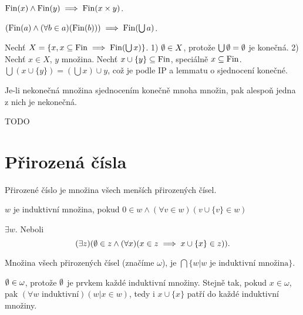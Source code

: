 \documentclass[12pt]{article}                   %
\begin{document}
    \begin{dusledek}
        $\operatorname{Fin}(x) \land \operatorname{Fin}(y) \implies \operatorname{Fin}(x \times y)$.
    \end{dusledek}

    \begin{lemma}
        $(\operatorname{Fin}(a) \land (\forall b \in a)(\operatorname{Fin}(b))) \implies \operatorname{Fin}(\bigcup a)$.

        \begin{dukazin}[Indukcí]
            Nechť $X = \{x, x \subseteq \operatorname{Fin} \implies \operatorname{Fin}(\bigcup x)\}$. 1) $\emptyset \in X$, protože $\bigcup \emptyset = \emptyset$ je konečná. 2) Nechť $x \in X$, $y$ množina. Nechť $x \cup \{y\} \subseteq \operatorname{Fin}$, speciálně $x \subseteq \operatorname{Fin}$. $\bigcup (x \cup \{y\}) = (\bigcup x)\cup y$, což je podle IP a lemmatu o sjednocení konečné.
        \end{dukazin}
    \end{lemma}

    \begin{dusledek}
        Je-li nekonečná množina sjednocením konečně mnoha množin, pak alespoň jedna z nich je nekonečná.
    \end{dusledek}


    TODO

\section{Přirozená čísla}
    \begin{definice}
        Přirozené číslo je množina všech menších přirozených čísel.
    \end{definice}

    \begin{definice}
        $w$ je induktivní množina, pokud $0 \in w \land (\forall v \in w)(v \cup \{v\} \in w)$
    \end{definice}

    \begin{definice}
        $\exists w$. Neboli
        $$ (\exists z)(\emptyset \in z \land (\forall x)(x \in z \implies x \cup \{x\} \in z)). $$ 
    \end{definice}

    \begin{definice}
        Množina všech přirozených čísel (značíme $\omega$), je $\bigcap \{w | w \text{ je induktivní množina}\}$.

        \begin{dukazin}
                $\emptyset \in \omega$, protože $\emptyset$ je prvkem každé induktivní množiny. Stejně tak, pokud $x \in \omega$, pak $(\forall w \text{ induktivní})(w|x \in w)$, tedy i $x \cup \{x\}$ patří do každé induktivní množiny.
        \end{dukazin}
    \end{definice}
\end{document}
